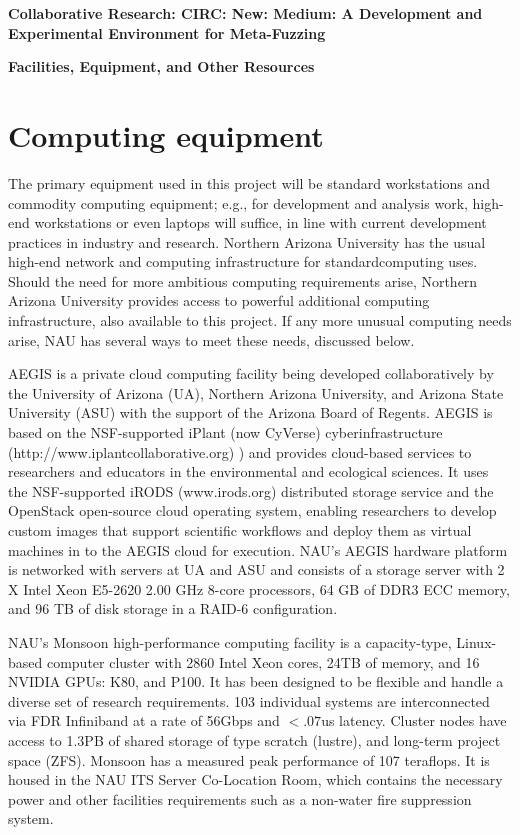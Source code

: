 \documentclass[12pt]{article}
\begin{document}
\begin{center}
{\Large\sf\textbf{Collaborative Research: CIRC: New: Medium: A Development and 
    Experimental Environment for Meta-Fuzzing
  }}
\end{center}

\begin{center}
{\sf\textbf{Facilities, Equipment, and Other Resources
  }}
\end{center}

\section*{Computing equipment}

The primary equipment used in this project will be standard workstations and 
commodity computing equipment; e.g., for development and analysis work, 
high-end workstations or even laptops will suffice, in line with current 
development practices in industry and research. Northern Arizona University has 
the usual high-end network and computing infrastructure for standardcomputing 
uses.  Should the need for more ambitious computing requirements arise, 
Northern Arizona University provides access to powerful additional computing 
infrastructure, also available to this project.   If any more unusual computing 
needs arise, NAU has several ways to meet these needs, discussed below.

AEGIS is a private cloud computing facility being developed collaboratively by 
the University of Arizona (UA), Northern Arizona University, and Arizona State 
University (ASU) with the support of the Arizona Board of Regents. AEGIS is 
based on the NSF-supported iPlant (now CyVerse) cyberinfrastructure 
(http://www.iplantcollaborative.org) ) and provides cloud-based services to 
researchers and educators in the environmental and ecological sciences. It uses 
the NSF-supported iRODS (www.irods.org) distributed storage service and the 
OpenStack open-source cloud operating system, enabling researchers to develop 
custom images that support scientific workflows and deploy them as virtual 
machines in to the AEGIS cloud for execution. NAU’s AEGIS hardware platform 
is networked with servers at UA and ASU and consists of a storage server with 2 
X Intel Xeon E5-2620 2.00 GHz 8-core processors, 64 GB of DDR3 ECC memory, and 
96 TB of disk storage in a RAID-6 configuration.

NAU’s Monsoon high-performance computing facility is a capacity-type, 
Linux-based computer cluster with 2860 Intel Xeon cores, 24TB of memory, and 16 
NVIDIA GPUs: K80, and P100. It has been designed to be flexible and handle a 
diverse set of research requirements. 103 individual systems are interconnected 
via FDR Infiniband at a rate of 56Gbps and $<.07$us latency. Cluster nodes have 
access to 1.3PB of shared storage of type scratch (lustre), and long-term 
project space (ZFS). Monsoon has a measured peak performance of 107 teraflops. 
It is housed in the NAU ITS Server Co-Location Room, which contains the 
necessary power and other facilities requirements such as a non-water fire 
suppression system.
\end{document}
